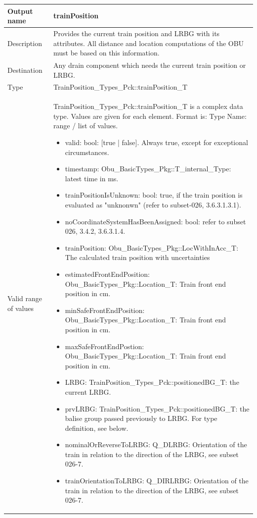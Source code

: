\begin{longtable}{p{}p{}}
\toprule
Output name				& trainPosition \\
\midrule
Description				& Provides the current train position and LRBG with its attributes. All distance and location computations of the OBU must be based on this information.   \\
\midrule
Destination				& Any drain component which needs the current train position or  LRBG. \\ 
\midrule
Type					& TrainPosition\_Types\_Pck::trainPosition\_T \\  
\midrule
Valid range of values	& TrainPosition\_Types\_Pck::trainPosition\_T is a complex data type. Values are given for each element. Format is: Type Name: range / list of values.
\begin{itemize}
\item valid: bool: [true | false]. Always true, except for exceptional circumstances.
\item timestamp: Obu\_BasicTypes\_Pkg::T\_internal\_Type: latest time in ms. 
\item trainPositionIsUnknown: bool: true, if the train position is evaluated as "unknonwn" (refer to subset-026, 3.6.3.1.3.1). 
\item noCoordinateSystemHasBeenAssigned: bool: refer to subset 026, 3.4.2, 3.6.3.1.4.
\item trainPosition: Obu\_BasicTypes\_Pkg::LocWithInAcc\_T: The calculated train position with uncertainties
\item estimatedFrontEndPosition: Obu\_BasicTypes\_Pkg::Location\_T: Train front end position in cm.
\item minSafeFrontEndPosition: Obu\_BasicTypes\_Pkg::Location\_T: Train front end position in cm.
\item maxSafeFrontEndPostion: Obu\_BasicTypes\_Pkg::Location\_T: Train front end position in cm.
\item LRBG: TrainPosition\_Types\_Pck::positionedBG\_T: the current LRBG. 
\item prvLRBG: TrainPosition\_Types\_Pck::positionedBG\_T: the balise group passed previously to LRBG. For type definition, see below.
\item nominalOrReverseToLRBG: Q\_DLRBG: Orientation of the train in relation to the direction of the LRBG, see subset 026-7.
\item trainOrientationToLRBG: Q\_DIRLRBG: Orientation of the train in relation to the direction of the LRBG, see subset 026-7.

\end{itemize}
\end{longtable}
